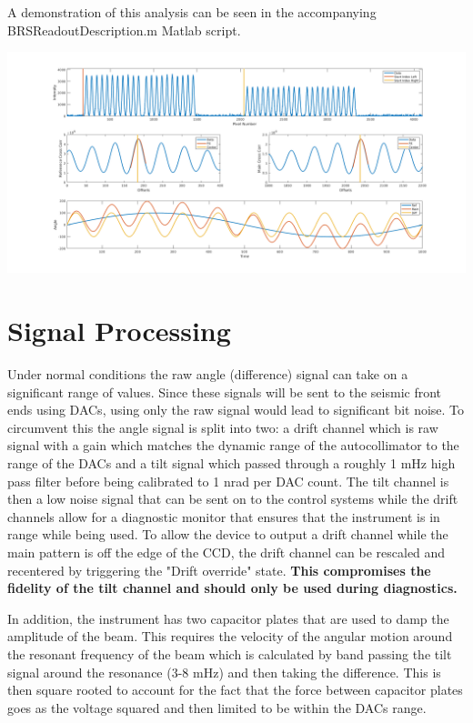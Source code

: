 \documentclass{article}
\begin{document}
A demonstration of this analysis can be seen in the accompanying BRSReadoutDescription.m Matlab script.

\includegraphics[width=\textwidth]{Demonstration.png}\\

\section{Signal Processing}

Under normal conditions the raw angle (difference) signal can take on a significant range of values. Since these signals will be sent to the seismic front ends using DACs, using only the raw signal would lead to significant bit noise. To circumvent this the angle signal is split into two: a drift channel which is raw signal with a gain which matches the dynamic range of the autocollimator to the range of the DACs and a tilt signal which passed through a roughly 1 mHz high pass filter before being calibrated to 1 nrad per DAC count. The tilt channel is then a low noise signal that can be sent on to the control systems while the drift channels allow for a diagnostic monitor that ensures that the instrument is in range while being used. To allow the device to output a drift channel while the main pattern is off the edge of the CCD, the drift channel can be rescaled and recentered by triggering the "Drift override" state. \textbf{This compromises the fidelity of the tilt channel and should only be used during diagnostics.}

In addition, the instrument has two capacitor plates that are used to damp the amplitude of the beam. This requires the velocity of the angular motion around the resonant frequency of the beam which is calculated by band passing the tilt signal around the resonance (3-8 mHz) and then taking the difference. This is then square rooted to account for the fact that the force between capacitor plates goes as the voltage squared and  then limited to be within the DACs range.
\end{document}
